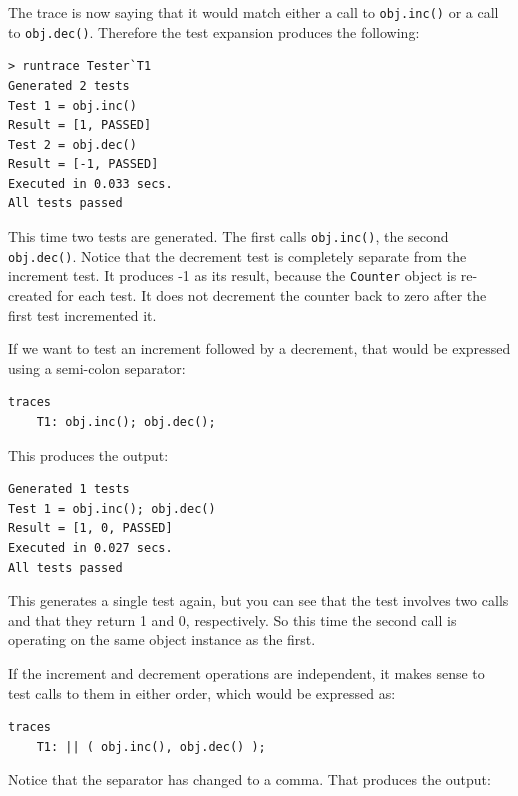 \documentclass{overturerepchap}
\begin{document}
The trace is now saying that it would match either a call to \texttt{obj.inc()}
or a call to \texttt{obj.dec()}. Therefore the test expansion produces the
following:

\lstset{style=tool,language=}
\begin{lstlisting}[escapechar=@]
> runtrace Tester`T1
Generated 2 tests
Test 1 = obj.inc()
Result = [1, PASSED]
Test 2 = obj.dec()
Result = [-1, PASSED]
Executed in 0.033 secs. 
All tests passed
\end{lstlisting}
\lstset{style=mystyle}
\lstset{language=VDM++}

This time two tests are generated. The first calls \texttt{obj.inc()}, the
second \texttt{obj.dec()}. Notice that the decrement test is completely separate
from the increment test. It produces -1 as its result, because the \texttt{Counter}
object is re-created for each test. It does not decrement the counter back to
zero after the first test incremented it.

If we want to test an increment followed by a decrement, that would be expressed
using a semi-colon separator:

\small
\begin{lstlisting}
traces
    T1: obj.inc(); obj.dec();
\end{lstlisting}
\normalsize

This produces the output:

\small
\lstset{style=tool,language=}
\begin{lstlisting}[escapechar=@]
Generated 1 tests
Test 1 = obj.inc(); obj.dec()
Result = [1, 0, PASSED]
Executed in 0.027 secs. 
All tests passed
\end{lstlisting}
\lstset{style=mystyle}
\lstset{language=VDM++}
\normalsize

This generates a single test again, but you can see that the test involves two
calls and that they return 1 and 0, respectively. So this time the second call
is operating on the same object instance as the first.

If the increment and decrement operations are independent, it makes sense to
test calls to them in either order, which would be expressed as:

\small
\begin{lstlisting}
traces
    T1: || ( obj.inc(), obj.dec() );
\end{lstlisting}
\normalsize

Notice that the separator has changed to a comma. That produces the output:
\end{document}
